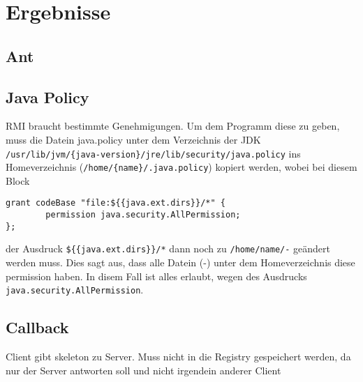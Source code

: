 
\section{Ergebnisse}
\label{sec:Ergebnisse}

\subsection{Ant}

\subsection{Java Policy}

RMI braucht bestimmte Genehmigungen. Um dem Programm diese zu geben, muss die Datein java.policy unter dem Verzeichnis der JDK \texttt{/usr/lib/jvm/\{java-version\}/jre/lib/security/java.policy} ins Homeverzeichnis (\texttt{/home/\{name\}/.java.policy}) kopiert werden, wobei bei diesem Block\\

\begin{lstlisting}[caption=java.policy]
grant codeBase "file:${{java.ext.dirs}}/*" {
        permission java.security.AllPermission;
};
\end{lstlisting}

der Ausdruck \texttt{\$\{\{java.ext.dirs\}\}/*} dann noch zu \texttt{/home/{name}/-} ge\"andert werden muss. Dies sagt aus, dass alle Datein (-) unter dem Homeverzeichnis diese permission haben. In disem Fall ist alles erlaubt, wegen des Ausdrucks \texttt{java.security.AllPermission}.

\subsection{Callback}
Client gibt skeleton zu Server. Muss nicht in die Registry gespeichert werden, da nur der Server antworten soll und nicht irgendein anderer Client
